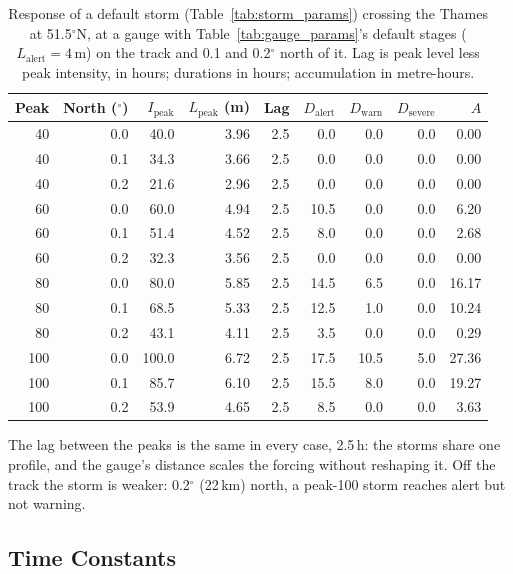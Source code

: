 \documentclass[11pt,a4paper]{article}
\newcommand{\sgLag}{2.5}
\begin{document}
\begin{table}[H]
    \centering
    \caption{Response of a default storm (Table~\ref{tab:storm_params}) crossing the Thames at 51.5$^\circ$N, at a gauge with Table~\ref{tab:gauge_params}'s default stages ($L_{\text{alert}}=4$\,m) on the track and 0.1 and 0.2$^\circ$ north of it. Lag is peak level less peak intensity, in hours; durations in hours; accumulation in metre-hours.}
    \label{tab:storm_response}
    \begin{tabular}{rrrrrrrrr}
        \toprule
        \textbf{Peak} & \textbf{North ($^\circ$)} & \textbf{$I_{\text{peak}}$} & \textbf{$L_{\text{peak}}$ (m)} & \textbf{Lag} & \textbf{$D_{\text{alert}}$} & \textbf{$D_{\text{warn}}$} & \textbf{$D_{\text{severe}}$} & \textbf{$A$} \\
        \midrule
        40 & 0.0 & 40.0 & 3.96 & 2.5 & 0.0 & 0.0 & 0.0 & 0.00 \\
        40 & 0.1 & 34.3 & 3.66 & 2.5 & 0.0 & 0.0 & 0.0 & 0.00 \\
        40 & 0.2 & 21.6 & 2.96 & 2.5 & 0.0 & 0.0 & 0.0 & 0.00 \\
        60 & 0.0 & 60.0 & 4.94 & 2.5 & 10.5 & 0.0 & 0.0 & 6.20 \\
        60 & 0.1 & 51.4 & 4.52 & 2.5 & 8.0 & 0.0 & 0.0 & 2.68 \\
        60 & 0.2 & 32.3 & 3.56 & 2.5 & 0.0 & 0.0 & 0.0 & 0.00 \\
        80 & 0.0 & 80.0 & 5.85 & 2.5 & 14.5 & 6.5 & 0.0 & 16.17 \\
        80 & 0.1 & 68.5 & 5.33 & 2.5 & 12.5 & 1.0 & 0.0 & 10.24 \\
        80 & 0.2 & 43.1 & 4.11 & 2.5 & 3.5 & 0.0 & 0.0 & 0.29 \\
        100 & 0.0 & 100.0 & 6.72 & 2.5 & 17.5 & 10.5 & 5.0 & 27.36 \\
        100 & 0.1 & 85.7 & 6.10 & 2.5 & 15.5 & 8.0 & 0.0 & 19.27 \\
        100 & 0.2 & 53.9 & 4.65 & 2.5 & 8.5 & 0.0 & 0.0 & 3.63 \\
        \bottomrule
    \end{tabular}
\end{table}

\noindent The lag between the peaks is the same in every case, \sgLag\,h: the storms
share one profile, and the gauge's distance scales the forcing without reshaping it.
Off the track the storm is weaker: 0.2$^\circ$ (22\,km) north, a peak-100 storm
reaches alert but not warning.

\subsection{Time Constants}
\end{document}
